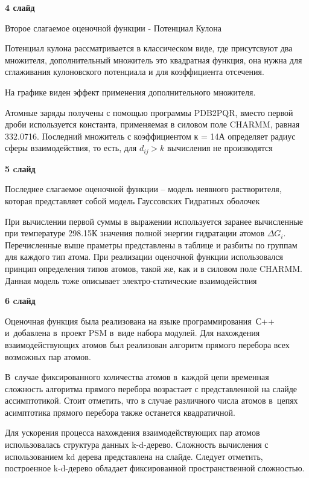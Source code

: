 \documentclass[30pt]{article}
\begin{document}
\vspace{+5mm}


\textbf{4 слайд}

Второе слагаемое оценочной функции - Потенциал Кулона

Потенциал кулона рассматривается в классическом виде, где присутсвуют два множителя, дополнительный множитель это квадратная функция, она нужна для сглаживания кулоновского потенциала и для коэффициента отсечения.

На графике виден эффект применения дополнительного множителя.

Атомные заряды получены с помощью программы PDB2PQR, вместо первой дроби используется константа, применяемая в силовом поле CHARMM, равная 332.0716. Последний множитель с коэффициентом к = 14А определяет радиус сферы взаимодействия, то есть, для $d_{ij} > k$ вычисления не производятся

\vspace{+5mm}


\textbf{5 cлайд}

Последнее слагаемое оценочной функции -- модель неявного растворителя, которая представляет собой модель Гауссовских Гидратных оболочек

При вычислении первой суммы в выражении используется заранее вычисленные при температуре 298.15К значения полной энергии гидратации атомов $\Delta G_i$. Перечисленные выше праметры представлены в таблице и разбиты по группам для каждого тип атома. При реализации оценочной функции использовался принцип определения типов атомов, такой же, как и в силовом поле CHARMM. Данная модель тоже описывает электро-статические взаимодействия

\vspace{+5mm}


\textbf{6 cлайд}

Оценочная функция была реализована на языке программирования~С++ и~добавлена в~проект PSM в~виде набора модулей. Для нахождения взаимодействующих атомов был реализован алгоритм прямого перебора всех возможных пар атомов.

В~случае фиксированного количества атомов в~каждой цепи временная сложность алгоритма прямого перебора возрастает с представленной на слайде ассимптотикой. Стоит отметить, что в случае различного числа атомов в~цепях асимптотика прямого перебора также останется квадратичной.

Для ускорения процесса нахождения взаимодействующих пар атомов использовалась структура данных k-d-дерево. Сложность вычисления с использованием kd дерева представлена на слайде. Следует отметить, построенное k-d-дерево обладает фиксированной пространственной сложностью.
\end{document}

